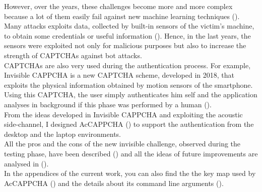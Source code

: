 However, over the years, these challenges become more and more complex because a lot of them easily fail against new machine learning techniques ().\\
Many attacks exploits data, collected by built-in sensors of the victim's machine, to obtain some credentials or useful information (). Hence, in the last years, the sensors were exploited not only for malicious purposes but also to increase the strength of CAPTCHAs against bot attacks.\\
CAPTCHAs are also very used during the authentication process. For example, Invisible CAPPCHA is a new CAPTCHA scheme, developed in 2018, that exploits the physical information obtained by motion sensors of the smartphone. Using this CAPTCHA, the user simply authenticates him self and the application analyses in background if this phase was performed by a human ().\\
From the ideas developed in Invisible CAPPCHA and exploiting the acoustic side-channel, I designed AcCAPPCHA () to support the authentication from the desktop and the laptop environments.\\
All the pros and the cons of the new invisible challenge, observed during the testing phase, have been described () and all the ideas of future improvements are analysed in ().\\
In the appendices of the current work, you can also find the the key map used by AcCAPPCHA () and the details about its command line arguments ().